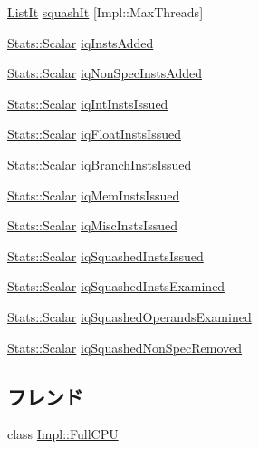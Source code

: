 \begin{DoxyCompactItemize}
\item 
\hyperlink{classInstQueue_a184cb829e22cc656acb41864f68f51ea}{ListIt} \hyperlink{classInstQueue_a76b506d03788e72757da427226e10356}{squashIt} \mbox{[}Impl::MaxThreads\mbox{]}
\item 
\hyperlink{classStats_1_1Scalar}{Stats::Scalar} \hyperlink{classInstQueue_a435e1ce10c3a7f54a60941e583adeb09}{iqInstsAdded}
\item 
\hyperlink{classStats_1_1Scalar}{Stats::Scalar} \hyperlink{classInstQueue_adf890a08fae50ea8249171b07c40adac}{iqNonSpecInstsAdded}
\item 
\hyperlink{classStats_1_1Scalar}{Stats::Scalar} \hyperlink{classInstQueue_a735f2023e70e53b7889a3a316bd3d57f}{iqIntInstsIssued}
\item 
\hyperlink{classStats_1_1Scalar}{Stats::Scalar} \hyperlink{classInstQueue_aa9f2fa124c9f0b4b22461b6717449d9a}{iqFloatInstsIssued}
\item 
\hyperlink{classStats_1_1Scalar}{Stats::Scalar} \hyperlink{classInstQueue_a928f22a2c6ce592adc40e5242c9d6572}{iqBranchInstsIssued}
\item 
\hyperlink{classStats_1_1Scalar}{Stats::Scalar} \hyperlink{classInstQueue_a5e7d55d3f07e86e389ca3a715766e108}{iqMemInstsIssued}
\item 
\hyperlink{classStats_1_1Scalar}{Stats::Scalar} \hyperlink{classInstQueue_ad234890bc414fffe7ed71840c51be5cb}{iqMiscInstsIssued}
\item 
\hyperlink{classStats_1_1Scalar}{Stats::Scalar} \hyperlink{classInstQueue_ac91799c895e5aff3af0afdbd7691a163}{iqSquashedInstsIssued}
\item 
\hyperlink{classStats_1_1Scalar}{Stats::Scalar} \hyperlink{classInstQueue_a8312e8984bcfab5a77de40e1738103db}{iqSquashedInstsExamined}
\item 
\hyperlink{classStats_1_1Scalar}{Stats::Scalar} \hyperlink{classInstQueue_a4398b6005b81008bd163bbba78dfd929}{iqSquashedOperandsExamined}
\item 
\hyperlink{classStats_1_1Scalar}{Stats::Scalar} \hyperlink{classInstQueue_a6c0b47431b6e84536fd9bb61624d6d97}{iqSquashedNonSpecRemoved}
\end{DoxyCompactItemize}
\subsection*{フレンド}
\begin{DoxyCompactItemize}
\item 
class \hyperlink{classInstQueue_a0b1390899d1d55620476dd762bd7ac6c}{Impl::FullCPU}
\end{DoxyCompactItemize}


